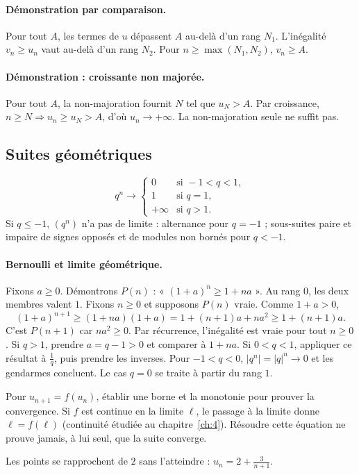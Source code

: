 \paragraph{Démonstration par comparaison.} Pour tout $A$, les termes de $u$ dépassent $A$ au-delà d'un rang $N_1$. L'inégalité $v_n\ge u_n$ vaut au-delà d'un rang $N_2$. Pour $n\ge\max(N_1,N_2)$, $v_n\ge A$.
\paragraph{Démonstration : croissante non majorée.} Pour tout $A$, la non-majoration fournit $N$ tel que $u_N>A$. Par croissance, $n\ge N\Rightarrow u_n\ge u_N>A$, d'où $u_n\to+\infty$. La non-majoration seule ne suffit pas.
\subsection{Suites géométriques}
\[q^n\longrightarrow\begin{cases}0&\text{si }-1<q<1,\\1&\text{si }q=1,\\+\infty&\text{si }q>1.\end{cases}\]
Si $q\le-1$, $(q^n)$ n'a pas de limite : alternance pour $q=-1$ ; sous-suites paire et impaire de signes opposés et de modules non bornés pour $q<-1$.
\paragraph{Bernoulli et limite géométrique.} Fixons $a\ge0$. Démontrons $P(n)$ : « $(1+a)^n\ge1+na$ ». Au rang $0$, les deux membres valent $1$.
Fixons $n\ge0$ et supposons $P(n)$ vraie. Comme $1+a>0$,
\[(1+a)^{n+1}\ge(1+na)(1+a)=1+(n+1)a+na^2\ge1+(n+1)a.\]
C'est $P(n+1)$ car $na^2\ge0$. Par récurrence, l'inégalité est vraie pour tout $n\ge0$. Si $q>1$, prendre $a=q-1>0$ et comparer à $1+na$. Si $0<q<1$, appliquer ce résultat à $\frac{1}{q}$, puis prendre les inverses. Pour $-1<q<0$, $|q^n|=|q|^n\to0$ et les gendarmes concluent. Le cas $q=0$ se traite à partir du rang $1$.
\begin{method}
Pour $u_{n+1}=f(u_n)$, établir une borne et la monotonie pour prouver la convergence. Si $f$ est continue en la limite $\ell$, le passage à la limite donne $\ell=f(\ell)$ (continuité étudiée au chapitre~\ref{ch:4}). Résoudre cette équation ne prouve jamais, à lui seul, que la suite converge.
\end{method}


\begin{center}\par\small Les points se rapprochent de $2$ sans l'atteindre : $u_n=2+\frac{3}{n+1}$.\end{center}

